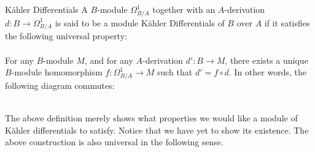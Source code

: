 \documentclass[a4paper]{article}
\begin{document}
\begin{defn}{Kähler Differentials}{} A $B$-module $\Omega_{B/A}^1$ together with an $A$-derivation $d:B\to\Omega_{B/A}^1$ is said to be a module Kähler Differentials of $B$ over $A$ if it satisfies the following universal property: \\~\\
For any $B$-module $M$, and for any $A$-derivation $d':B\to M$, there exists a unique $B$-module homomorphism $f:\Omega_{B/A}^1\to M$ such that $d'=f\circ d$. In other words, the following diagram commutes: \\~\\
\end{defn}

The above definition merely shows what properties we would like a module of Kähler differentials to satisfy. Notice that we have yet to show its existence. The above construction is also universal in the following sense. 
\end{document}
